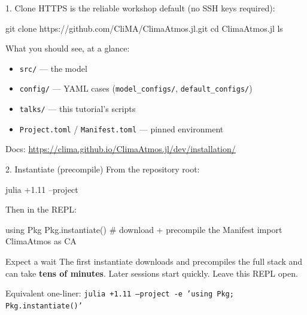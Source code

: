 \documentclass[aspectratio=169,11pt]{beamer}
\begin{document}
\begin{frame}[fragile]{1. Clone}
HTTPS is the reliable workshop default (no SSH keys required):
\vspace{0.4em}
\begin{semiverbatim}
git clone https://github.com/CliMA/ClimaAtmos.jl.git
cd ClimaAtmos.jl
ls
\end{semiverbatim}
\vspace{0.5em}
What you should see, at a glance:
\begin{itemize}
  \item \texttt{src/} --- the model
  \item \texttt{config/} --- YAML cases (\texttt{model\_configs/}, \texttt{default\_configs/})
  \item \texttt{talks/} --- this tutorial's scripts
  \item \texttt{Project.toml} / \texttt{Manifest.toml} --- pinned environment
\end{itemize}
\small
Docs: \url{https://clima.github.io/ClimaAtmos.jl/dev/installation/}
\end{frame}

\begin{frame}[fragile]{2. Instantiate (precompile)}
From the repository root:
\vspace{0.3em}
\begin{semiverbatim}
julia +1.11 --project
\end{semiverbatim}
Then in the REPL:
\begin{semiverbatim}
using Pkg
Pkg.instantiate()    # download + precompile the Manifest
import ClimaAtmos as CA
\end{semiverbatim}
\vspace{0.4em}
\begin{block}{Expect a wait}
The first instantiate downloads and precompiles the full stack and can take
\textbf{tens of minutes}. Later sessions start quickly. Leave this REPL open.
\end{block}
\small
Equivalent one-liner: \texttt{julia +1.11 --project -e 'using Pkg; Pkg.instantiate()'}
\end{frame}
\end{document}
